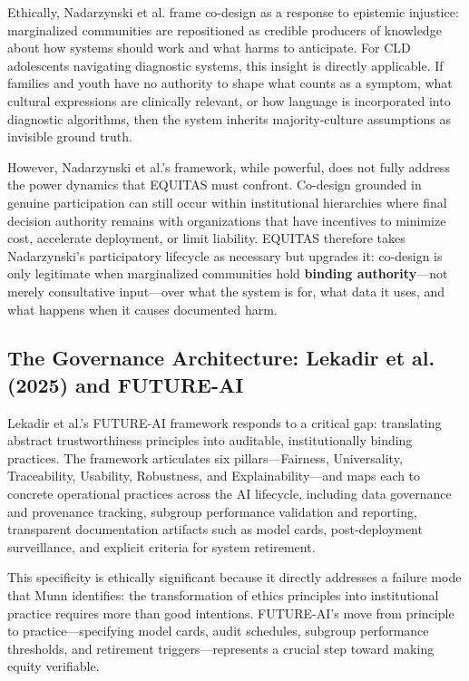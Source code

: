 \documentclass[12pt,a4paper]{article}
\begin{document}
Ethically, Nadarzynski et al. frame co-design as a response to epistemic injustice: marginalized communities are repositioned as credible producers of knowledge about how systems should work and what harms to anticipate. For CLD adolescents navigating diagnostic systems, this insight is directly applicable. If families and youth have no authority to shape what counts as a symptom, what cultural expressions are clinically relevant, or how language is incorporated into diagnostic algorithms, then the system inherits majority-culture assumptions as invisible ground truth.\cite{nadarzynski2024}

However, Nadarzynski et al.'s framework, while powerful, does not fully address the power dynamics that EQUITAS must confront. Co-design grounded in genuine participation can still occur within institutional hierarchies where final decision authority remains with organizations that have incentives to minimize cost, accelerate deployment, or limit liability. EQUITAS therefore takes Nadarzynski's participatory lifecycle as necessary but upgrades it: co-design is only legitimate when marginalized communities hold \textbf{binding authority}—not merely consultative input—over what the system is for, what data it uses, and what happens when it causes documented harm.

\subsection{The Governance Architecture: Lekadir et al. (2025) and FUTURE-AI}

Lekadir et al.'s FUTURE-AI framework responds to a critical gap: translating abstract trustworthiness principles into auditable, institutionally binding practices. The framework articulates six pillars—Fairness, Universality, Traceability, Usability, Robustness, and Explainability—and maps each to concrete operational practices across the AI lifecycle, including data governance and provenance tracking, subgroup performance validation and reporting, transparent documentation artifacts such as model cards, post-deployment surveillance, and explicit criteria for system retirement.\cite{lekadir2025}

This specificity is ethically significant because it directly addresses a failure mode that Munn identifies: the transformation of ethics principles into institutional practice requires more than good intentions. FUTURE-AI's move from principle to practice—specifying model cards, audit schedules, subgroup performance thresholds, and retirement triggers—represents a crucial step toward making equity verifiable.\cite{lekadir2025}
\end{document}

